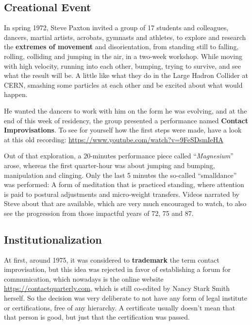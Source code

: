 \subsection{Creational Event}\label{subsec:creational-event}

In spring 1972, Steve Paxton invited a group of 17 students and colleagues, dancers, martial artists, acrobats, gymnasts and athletes, to explore and research the \textbf{extremes of movement} and disorientation, from standing still to falling, rolling, colliding and jumping in the air, in a two-week workshop.
While moving with high velocity, running into each other, bumping, trying to survive, and see what the result will be.
A little like what they do in the Large Hadron Collider at CERN, smashing some particles at each other and be excited about what would happen.

He wanted the dancers to work with him on the form he was evolving, and at the end of this week of residency, the group presented a performance named \textbf{Contact Improvisations}.
To see for yourself how the first steps were made, have a look at this old recording: \url{https://www.youtube.com/watch?v=9FeSDsmIeHA}

Out of that exploration, a 20-minutes performance piece called ``\textit{Magnesium}'' arose, whereas the first quarter-hour was about jumping and bumping, manipulation and clinging.
Only the last 5 minutes the so-called ``\gls{smalldance}'' was performed: A form of meditation that is practiced standing, where attention is paid to postural adjustments and micro-weight transfers.
Videos narrated by Steve about that are available, which are very much encouraged to watch, to also see the progression from those impactful years of 72, 75 and 87.

\subsection{Institutionalization}\label{subsec:institutionalization}

At first, around 1975, it was considered to \textbf{trademark} the term contact improvisation, but this idea was rejected in favor of establishing a forum for communication, which nowadays is the online website \url{https://contactquarterly.com}, which is still co-edited by Nancy Stark Smith herself.
So the decision was very deliberate to not have any form of legal institute or certifications, free of any hierarchy.
A certificate usually doesn't mean that that person is good, but just that the certification was passed.

